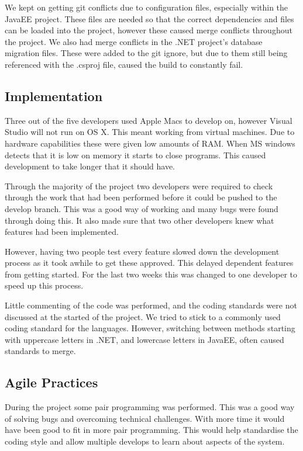 We kept on getting git conflicts due to configuration files, especially within the JavaEE project. These files are needed so that the correct dependencies and files can be loaded into the project, however these caused merge conflicts throughout the project. We also had merge conflicts in the .NET project's database migration files. These were added to the git ignore, but due to them still being referenced with the .csproj file, caused the build to constantly fail.

\subsection{Implementation}

Three out of the five developers used Apple Macs to develop on, however Visual Studio will not run on OS X. This meant working from virtual machines.  Due to hardware capabilities these were given low amounts of RAM. When MS windows detects that it is low on memory it starts to close programs. This caused development to take longer that it should have.

Through the majority of the project two developers were required to check through the work that had been performed before it could be pushed to the develop branch. This was a good way of working and many bugs were found through doing this. It also made sure that two other developers knew what features had been implemented.

However, having two people test every feature slowed down the development process as it took awhile to get these approved. This delayed dependent features from getting started. For the last two weeks this was changed to one developer to speed up this process.

Little commenting of the code was performed, and the coding standards were not discussed at the started of the project. We tried to stick to a commonly used coding standard for the languages. However, switching between methods starting with uppercase letters in .NET, and lowercase letters in JavaEE, often caused standards to merge.

\subsection{Agile Practices}

During the project some pair programming was performed. This was a good way of solving bugs and overcoming technical challenges. With more time it would have been good to fit in more pair programming. This would help standardise the coding style and allow multiple develops to learn about aspects of the system.

